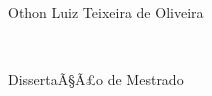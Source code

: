 \begin{titlepage}
\begin{center}
{\Large Othon Luiz Teixeira de Oliveira}

\vspace{1.3in}

{\Large \textbf{} } \\

\vspace{1.4in}

{\large DissertaÃ§Ã£o de Mestrado}


\vspace{1.6in}

\dataQualif

\end{center}
\end{titlepage} 